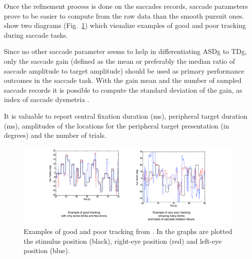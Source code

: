 Once the refinement process is done on the saccades records, saccade parameters prove to be easier to compute from the raw data than the smooth pursuit ones. \cite{pensiero2009saccades} show two diagrams (Fig.~\ref{fig:saccaderecordex}) which visualize examples of good and poor tracking during saccade tasks.

Since no other saccade parameter seems to help in differentiating ASDg to TDg, only the saccade gain (defined as the mean or preferably the median ratio of saccade amplitude to target amplitude) should be used as primary performance outcomes in the saccade task. With the gain mean and the number of sampled saccade records it is possible to compute the standard deviation of the gain, as index of saccade dysmetria \cite{johnson2016review}.

It is valuable to report central fixation duration (ms), peripheral target duration (ms), amplitudes of the locations for the peripheral target presentation (in degrees) and the number of trials.

\begin{figure}[h]
  \centering
  \includegraphics[width=.9\textwidth]{figures/saccadespensiero-07.jpg}
  \caption[Example of saccades graph]{Examples of good and poor tracking from \cite{pensiero2009saccades}. In the graphs are plotted the stimulus position (black), right-eye position (red) and left-eye position (blue).}
  \label{fig:saccaderecordex}
\end{figure}

